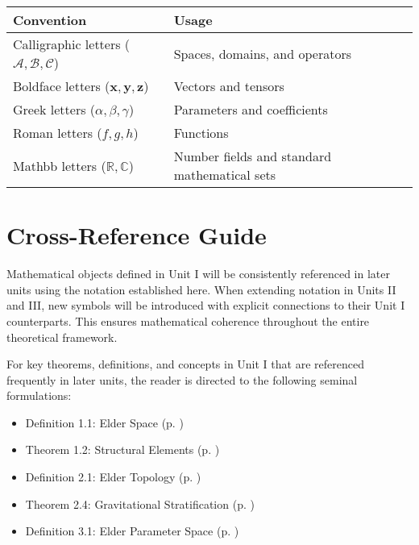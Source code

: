 \begin{tabular}{p{}p{}}
\textbf{Convention} & \textbf{Usage} \\
\hline
Calligraphic letters ($\mathcal{A, B, C}$) & Spaces, domains, and operators \\
Boldface letters ($\boldsymbol{x, y, z}$) & Vectors and tensors \\
Greek letters ($\alpha, \beta, \gamma$) & Parameters and coefficients \\
Roman letters ($f, g, h$) & Functions \\
Mathbb letters ($\mathbb{R}, \mathbb{C}$) & Number fields and standard mathematical sets \\
\hline
\end{tabular}

\section*{Cross-Reference Guide}

Mathematical objects defined in Unit I will be consistently referenced in later units using the notation established here. When extending notation in Units II and III, new symbols will be introduced with explicit connections to their Unit I counterparts. This ensures mathematical coherence throughout the entire theoretical framework.

For key theorems, definitions, and concepts in Unit I that are referenced frequently in later units, the reader is directed to the following seminal formulations:
\begin{itemize}
    \item Definition 1.1: Elder Space (p. \pageref{def:elder_space})
    \item Theorem 1.2: Structural Elements (p. \pageref{thm:structural_elements})
    \item Definition 2.1: Elder Topology (p. \pageref{def:elder_topology})
    \item Theorem 2.4: Gravitational Stratification (p. \pageref{thm:gravitational_stratification})
    \item Definition 3.1: Elder Parameter Space (p. \pageref{def:elder_parameter_space})
\end{itemize}